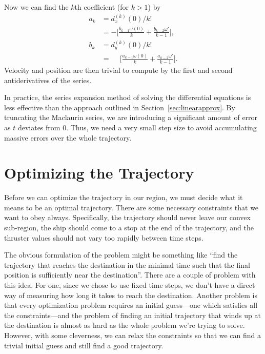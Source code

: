 \documentclass{report}
\begin{document}
Now we can find the $k$th coefficient (for $k > 1$) by
\begin{equation}
    \begin{aligned}
        a_k &= d_x^{(k)}(0)/k! \\
            &= -\Bigg[ \frac{b_{k-1} \omega(0)}{k}  + \frac{b_{k-2} \omega'}{k-1}  \Bigg],\\
        b_k &= d_y^{(k)}(0)/k! \\
            &= \phantom{-} \Bigg[ \frac{a_{k-1} \omega(0)}{k}  + \frac{a_{k-2} \omega'}{k-1}  \Bigg].
    \end{aligned}
\end{equation}
Velocity and position are then trivial to compute by the first and second antiderivatives
of the series.

In practice, the series expansion method of solving the differential equations is less effective
than the approach outlined in Section~\ref{sec:linearapprox}. By truncating the Maclaurin series, we
are introducing a significant amount of error as $t$ deviates from $0$. Thus, we need a very small step size
to avoid accumulating massive errors over the whole trajectory.

\section{Optimizing the Trajectory}
Before we can optimize the trajectory in our region, we must decide what it means to
be an optimal trajectory. There are some necessary constraints that we want to obey always. Specifically,
the trajectory should never leave our convex sub-region, the ship should come to a stop at the end of
the trajectory, and the thruster values should not vary too rapidly between time steps.

The obvious formulation of the problem might be something like ``find the trajectory that reaches the destination
in the minimal time such that the final position is sufficiently near the destination''. There are a couple of problem
with this idea. For one, since we chose to use fixed time steps, we don't have a direct way of measuring how
long it takes to reach the destination. Another problem is that every optimization problem requires an initial guess---one
which satisfies all the constraints---and the problem of finding an initial trajectory that winds up at the destination
is almost as hard as the whole problem we're trying to solve. However, with some cleverness, we can relax the constraints
so that we can find a trivial initial guess and still find a good trajectory.
\end{document}
